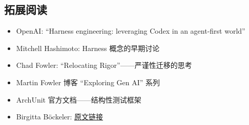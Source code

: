 \subsection{拓展阅读}

\begin{itemize}[leftmargin=1.5em]
    \item OpenAI: ``Harness engineering: leveraging Codex in an agent-first world''
    \item Mitchell Hashimoto: Harness 概念的早期讨论
    \item Chad Fowler: ``Relocating Rigor''------严谨性迁移的思考
    \item Martin Fowler 博客 ``Exploring Gen AI'' 系列
    \item ArchUnit 官方文档------结构性测试框架
    \item Birgitta B\"{o}ckeler: \href{https://martinfowler.com/articles/exploring-gen-ai/harness-engineering.html}{原文链接}
\end{itemize}



